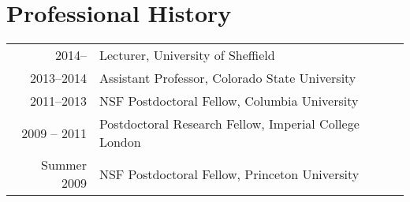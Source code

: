\documentclass[11pt,letterpaper]{article}
\begin{document}
\section*{Professional History}
\begin{tabular}{rl}
2014-- & Lecturer, University of Sheffield \\
\rule{0pt}{3ex} 2013--2014 & Assistant Professor, Colorado State University \\
\rule{0pt}{3ex} 2011--2013 & NSF Postdoctoral Fellow, Columbia University \\
\rule{0pt}{3ex}2009 -- 2011 & Postdoctoral Research Fellow, Imperial College London \\
\rule{0pt}{3ex} Summer 2009 & NSF Postdoctoral Fellow, Princeton University
\end{tabular}
\end{document}
